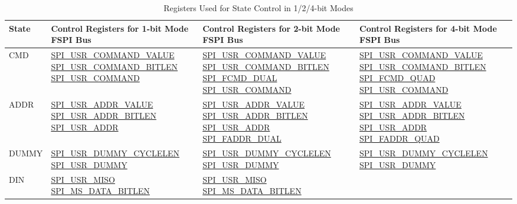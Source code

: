 \documentclass[main\_\_EN.tex]{subfiles}
\begin{document}
\begin{longtable}[c]{ |L{1.3cm}|L{4.8cm}|L{4.8cm}|L{4.8cm}| }
\caption{Registers Used for State Control in 1/2/4-bit Modes}
\\\hline
{}
\textbf{State} & \textbf{Control Registers for 1-bit Mode FSPI Bus} & \textbf{Control Registers for 2-bit Mode FSPI Bus} & \textbf{Control Registers for 4-bit Mode FSPI Bus} \\
     \hline
\endhead
\label{tab:spi-state-control-reg}
CMD  &\hyperref[fielddesc:SPIUSRCOMMANDVALUE]{SPI\_USR\_COMMAND\_VALUE}
      \hyperref[fielddesc:SPIUSRCOMMANDBITLEN]{SPI\_USR\_COMMAND\_BITLEN} \hyperref[fielddesc:SPIUSRCOMMAND]{SPI\_USR\_COMMAND}
     &\hyperref[fielddesc:SPIUSRCOMMANDVALUE]{SPI\_USR\_COMMAND\_VALUE} \hyperref[fielddesc:SPIUSRCOMMANDBITLEN]{SPI\_USR\_COMMAND\_BITLEN} \hyperref[fielddesc:SPIFCMDDUAL]{SPI\_FCMD\_DUAL}     \hyperref[fielddesc:SPIUSRCOMMAND]{SPI\_USR\_COMMAND} & \hyperref[fielddesc:SPIUSRCOMMANDVALUE]{SPI\_USR\_COMMAND\_VALUE}  \hyperref[fielddesc:SPIUSRCOMMANDBITLEN]{SPI\_USR\_COMMAND\_BITLEN}   \hyperref[fielddesc:SPIFCMDQUAD]{SPI\_FCMD\_QUAD}    \hyperref[fielddesc:SPIUSRCOMMAND]{SPI\_USR\_COMMAND} \\
     \hline
ADDR &\hyperref[fielddesc:SPIUSRADDRVALUE]{SPI\_USR\_ADDR\_VALUE}
      \hyperref[fielddesc:SPIUSRADDRBITLEN]{SPI\_USR\_ADDR\_BITLEN}    \hyperref[fielddesc:SPIUSRADDR]{SPI\_USR\_ADDR}
     &\hyperref[fielddesc:SPIUSRADDRVALUE]{SPI\_USR\_ADDR\_VALUE}   \hyperref[fielddesc:SPIUSRADDRBITLEN]{SPI\_USR\_ADDR\_BITLEN}    \hyperref[fielddesc:SPIUSRADDR]{SPI\_USR\_ADDR}      \hyperref[fielddesc:SPIFADDRDUAL]{SPI\_FADDR\_DUAL} &
     \hyperref[fielddesc:SPIUSRADDRVALUE]{SPI\_USR\_ADDR\_VALUE}   \hyperref[fielddesc:SPIUSRADDRBITLEN]{SPI\_USR\_ADDR\_BITLEN}    \hyperref[fielddesc:SPIUSRADDR]{SPI\_USR\_ADDR}                \hyperref[fielddesc:SPIFADDRQUAD]{SPI\_FADDR\_QUAD} \\
     \hline
DUMMY&\hyperref[fielddesc:SPIUSRDUMMYCYCLELEN]{SPI\_USR\_DUMMY\_CYCLELEN}
      \hyperref[fielddesc:SPIUSRDUMMY]{SPI\_USR\_DUMMY}
     &\hyperref[fielddesc:SPIUSRDUMMYCYCLELEN]{SPI\_USR\_DUMMY\_CYCLELEN}     \hyperref[fielddesc:SPIUSRDUMMY]{SPI\_USR\_DUMMY} &
     \hyperref[fielddesc:SPIUSRDUMMYCYCLELEN]{SPI\_USR\_DUMMY\_CYCLELEN}     \hyperref[fielddesc:SPIUSRDUMMY]{SPI\_USR\_DUMMY}\\
     \hline
DIN  &\hyperref[fielddesc:SPIUSRMISO]{SPI\_USR\_MISO}
      \hyperref[fielddesc:SPIMSDATABITLEN]{SPI\_MS\_DATA\_BITLEN}
     &\hyperref[fielddesc:SPIUSRMISO]{SPI\_USR\_MISO}
     \hyperref[fielddesc:SPIMSDATABITLEN]{SPI\_MS\_DATA\_BITLEN}

\end{longtable}
\end{document}
